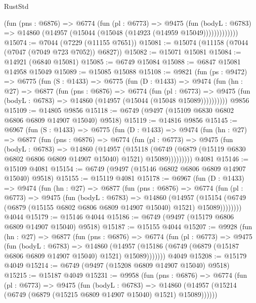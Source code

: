 \begin{lexlean}{RustStd}
\begin{coremodule}
              (fun (pns : @6876) =>
              @6774
                (fun (pl : @6773) =>
                @9475
                  (fun (bodyL : @6783) =>
                  @14860 (@14957 (@15044 (@15048 (@14923 (@14959 @15049)))))))))))))
@15074 := @7044 (@7229 (@11155 @7651))
@15081 := @15074 (@11158 (@7044 (@7047 (@7049 @723 @7052)) @6827))
@15082 := @15071 @15081
@15084 := @14921 (@6840 @15081)
@15085 := @6749 @15084
@15088 := @6847 @15081 @14958 @15049
@15089 := @15085 @15088
@15108 := @9821
    (fun (ps : @9472) =>
    @6775
      (fun (S : @1433) =>
      @6775
        (fun (D : @1433) =>
        @9474
          (fun (hn : @27) =>
          @6877
            (fun (pns : @6876) =>
            @6774
              (fun (pl : @6773) =>
              @9475 (fun (bodyL : @6783) => @14860 (@14957 (@15044 (@15048 @15089))))))))))
    @9856
@15109 := @14805 @9856
@15118 := @6749 (@9497 (@15109 @6830 @6802 @6806 @6809 @14907 @15040) @9518)
@15119 := @14816 @9856
@15145 := @6967
    (fun (S : @1433) =>
    @6775
      (fun (D : @1433) =>
      @9474
        (fun (hn : @27) =>
        @6877
          (fun (pns : @6876) =>
          @6774
            (fun (pl : @6773) =>
            @9475
              (fun (bodyL : @6783) =>
              @14860
                (@14957
                  (@15118
                    (@6749
                      (@6879 (@15119 @6830 @6802 @6806 @6809 @14907 @15040) @1521)
                      @15089)))))))))
    @4081
@15146 := @15109 @4081
@15154 := @6749 (@9497 (@15146 @6802 @6806 @6809 @14907 @15040) @9518)
@15155 := @15119 @4081
@15178 := @6967
    (fun (D : @1433) =>
    @9474
      (fun (hn : @27) =>
      @6877
        (fun (pns : @6876) =>
        @6774
          (fun (pl : @6773) =>
          @9475
            (fun (bodyL : @6783) =>
            @14860
              (@14957
                (@15154 (@6749 (@6879 (@15155 @6802 @6806 @6809 @14907 @15040) @1521) @15089))))))))
    @4044
@15179 := @15146 @4044
@15186 := @6749 (@9497 (@15179 @6806 @6809 @14907 @15040) @9518)
@15187 := @15155 @4044
@15207 := @9928
    (fun (hn : @27) =>
    @6877
      (fun (pns : @6876) =>
      @6774
        (fun (pl : @6773) =>
        @9475
          (fun (bodyL : @6783) =>
          @14860
            (@14957 (@15186 (@6749 (@6879 (@15187 @6806 @6809 @14907 @15040) @1521) @15089)))))))
    @4049
@15208 := @15179 @4049
@15214 := @6749 (@9497 (@15208 @6809 @14907 @15040) @9518)
@15215 := @15187 @4049
@15231 := @9958
    (fun (pns : @6876) =>
    @6774
      (fun (pl : @6773) =>
      @9475
        (fun (bodyL : @6783) =>
        @14860 (@14957 (@15214 (@6749 (@6879 (@15215 @6809 @14907 @15040) @1521) @15089))))))

\end{coremodule}
\end{lexlean}
